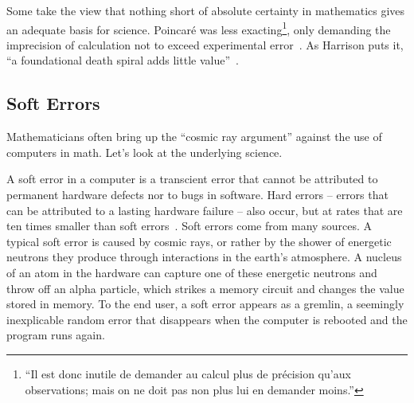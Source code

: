 \documentclass{llncs}
\begin{document}
Some take the view that nothing short of absolute certainty in
mathematics gives an adequate basis for science.  Poincar\'e was less
exacting\footnote{``Il est donc inutile de demander au calcul plus de pr\'ecision
qu'aux observations; mais on ne doit pas non plus lui en demander moins.''}, 
only demanding the imprecision of calculation not to exceed
 experimental error~\cite{HPMC}.  As Harrison puts it, 
``a foundational death spiral adds little value''~\cite{harrison-pm}.





\subsection{Soft Errors}\label{sec:soft}

Mathematicians often bring up the ``cosmic ray argument'' against the use
of computers in math.  Let's look at the underlying science.

A soft error in a computer is a transcient error that cannot be
attributed to permanent hardware defects nor to bugs in software.  
Hard errors -- errors that can be attributed to a lasting hardware failure --
also occur, but at rates that are ten times smaller than
soft errors~\cite{MW04}.
Soft errors come from many sources. A
typical soft error is caused by cosmic rays, or rather by the shower
of energetic neutrons they produce through interactions in the earth's
atmosphere.  A nucleus of an atom in the hardware can capture one of
these energetic neutrons and throw off an alpha particle, which
strikes a memory circuit and changes the value stored in memory.  To
the end user, a soft error appears as a gremlin, a seemingly
inexplicable random error that disappears when the computer is rebooted and
the program runs again.
\end{document}
